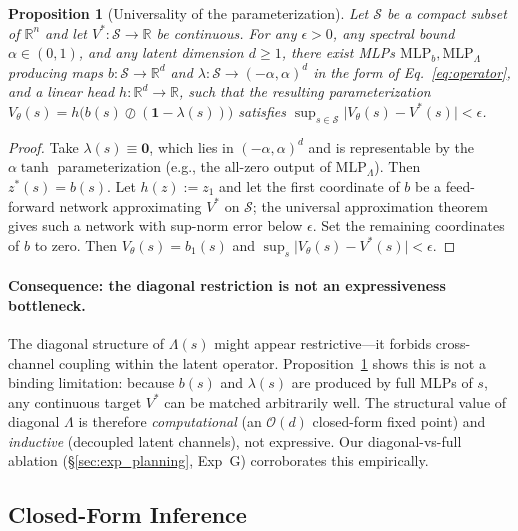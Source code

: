 \documentclass{article}
\newtheorem{proposition}{Proposition}
\newcommand{\R}{\mathbb{R}}
\newcommand{\zstar}{z^*}                     %
\newcommand{\spb}{\alpha}                    %
\newcommand{\eigs}{\lambda}                  %
\begin{document}
\begin{proposition}[Universality of the parameterization]
\label{prop:universal}
Let $\mathcal{S}$ be a compact subset of $\R^n$ and let $V^*: \mathcal{S}\to\R$
be continuous. For any $\epsilon > 0$, any spectral bound $\spb \in (0,1)$, and
any latent dimension $d \geq 1$, there exist MLPs $\mathrm{MLP}_b,
\mathrm{MLP}_\Lambda$ producing maps $b: \mathcal{S}\to\R^d$ and
$\eigs: \mathcal{S}\to(-\spb,\spb)^d$ in the form of Eq.~\eqref{eq:operator},
and a linear head $h: \R^d \to \R$, such that the resulting parameterization
$V_\theta(s) = h\bigl(b(s)\oslash(\mathbf{1}-\eigs(s))\bigr)$ satisfies
$\sup_{s\in\mathcal{S}} \lvert V_\theta(s) - V^*(s)\rvert < \epsilon$.
\end{proposition}
\begin{proof}
Take $\eigs(s) \equiv \mathbf{0}$, which lies in $(-\spb,\spb)^d$ and is
representable by the $\spb\tanh$ parameterization (e.g., the all-zero output of
$\mathrm{MLP}_\Lambda$). Then $\zstar(s) = b(s)$. Let $h(z) := z_1$ and let the
first coordinate of $b$ be a feed-forward network approximating $V^*$ on
$\mathcal{S}$; the universal approximation theorem~\citep{hornik1989multilayer}
gives such a network with sup-norm error below $\epsilon$. Set the remaining
coordinates of $b$ to zero. Then $V_\theta(s) = b_1(s)$ and
$\sup_s\lvert V_\theta(s)-V^*(s)\rvert < \epsilon$.
\end{proof}

\paragraph{Consequence: the diagonal restriction is not an expressiveness
bottleneck.}
The diagonal structure of $\Lambda(s)$ might appear restrictive---it forbids
cross-channel coupling within the latent operator. Proposition~\ref{prop:universal}
shows this is not a binding limitation: because $b(s)$ and $\eigs(s)$ are
produced by full MLPs of $s$, any continuous target $V^*$ can be matched
arbitrarily well. The structural value of diagonal $\Lambda$ is therefore
\emph{computational} (an $\mathcal{O}(d)$ closed-form fixed point) and
\emph{inductive} (decoupled latent channels), not expressive. Our diagonal-vs-full
ablation (\S\ref{sec:exp_planning}, Exp~G) corroborates this empirically.

\subsection{Closed-Form Inference}
\label{sec:closedform}
\end{document}
